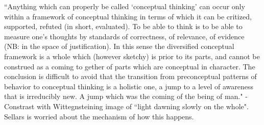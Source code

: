 ``Anything which can properly be called `conceptual thinking' can occur only within a framework of conceptual thinking in terms of which it can be critized, supported, refuted (in short, evaluated). To be able to think is to be able to measure one's thoughts by standards of correctness, of relevance, of evidence (NB: in the space of justification). In this sense the diversified conceptual framework is a whole which (however sketchy) is prior to its parts, and cannot be construed as a coming to gether of parts which are conceptual in character. The conclusion is difficult to avoid that the transition from preconceptual patterns of behavior to conceptual thinking is a holistic one, a jump to a level of awareness that is irreducibly new. A jump which was the coming of the being of man." - Constrast with Wittegnsteining image of ``light dawning slowly on the whole". Sellars is worried about the mechanism of how this happens.
